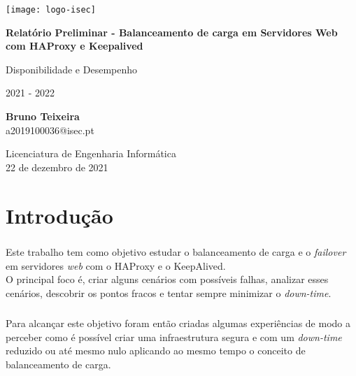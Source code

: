 \documentclass{report}
\begin{document}
	\begin{titlepage}
    	\begin{center}
    		\texttt{[image: logo-isec]}
    		
    		\vspace*{\fill}
    		
    		\Huge
    		\textbf{Relatório Preliminar - Balanceamento de carga em Servidores Web com HAProxy e Keepalived}
    		
    		\huge
    		Disponibilidade e Desempenho
    		
    		\vspace{0.5cm}
    		\LARGE
    		2021 - 2022
    		
    		\vspace{1.5cm}
    		
    		\textbf{Bruno Teixeira}\\
                a2019100036@isec.pt
    		
    		\vfill
    		\vspace*{\fill}
    		
    		\normalsize
    		Licenciatura de Engenharia Informática \\
    		22 de dezembro de 2021
    	\end{center}
    \end{titlepage}



\tableofcontents
\listoffigures    %


\clearpage
{}


\chapter{Introdução}\label{chap.introducao}
\paragraph{}
Este trabalho tem como objetivo estudar o balanceamento de carga e o \emph{failover} em servidores \emph{web} com o HAProxy e o KeepAlived. \\
O principal foco é, criar alguns cenários com possíveis falhas, analizar esses cenários, descobrir os pontos fracos e tentar sempre minimizar o \emph{down-time}.
\paragraph{}
Para alcançar este objetivo foram então criadas algumas experiências de modo a perceber como é possível criar uma infraestrutura segura e com um \emph{down-time} reduzido ou até mesmo nulo aplicando ao mesmo tempo o conceito de balanceamento de carga.
\end{document}
